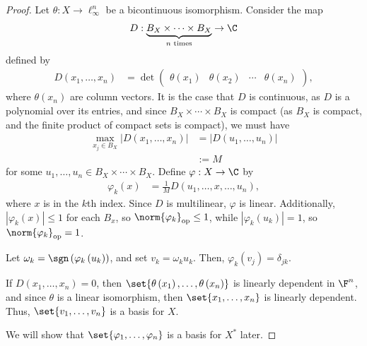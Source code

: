 \documentclass[10pt]{mypackage}
\begin{document}
\begin{proof}
  Let $\theta: X\rightarrow \ell_{\infty}^{n}$ be a bicontinuous isomorphism. Consider the map
  \begin{align*}
    D: \underbrace{B_{X}\times\cdots\times B_X}_{\text{$n$ times}}\rightarrow \C
  \end{align*}
  defined by
  \begin{align*}
    D\left(x_1,\dots,x_n\right) &= \det \begin{pmatrix}\theta\left(x_1\right) & \theta\left(x_2\right) & \cdots & \theta\left(x_n\right)\end{pmatrix},
  \end{align*}
  where $\theta\left(x_n\right)$ are column vectors. It is the case that $D$ is continuous, as $D$ is a polynomial over its entries, and since $B_X\times\cdots\times B_X$ is compact (as $B_X$ is compact, and the finite product of compact sets is compact), we must have
  \begin{align*}
    \max_{x_j\in B_X}\left\vert D\left(x_1,\dots,x_n\right) \right\vert &= \left\vert D\left(u_1,\dots,u_n\right) \right\vert\\
                                                                        &:= M
  \end{align*}
  for some $u_1,\dots,u_n\in B_X\times\cdots\times B_X$. Define $\varphi: X\rightarrow \C$ by
  \begin{align*}
    \varphi_k\left(x\right) &= \frac{1}{M}D\left(u_1,\dots,x,\dots,u_n\right),
  \end{align*}
  where $x$ is in the $k$th index. Since $D$ is multilinear, $\varphi$ is linear. Additionally, $\left\vert \varphi_k(x) \right\vert\leq 1$ for each $B_x$, so $\norm{\varphi_k}_{\text{op}} \leq 1$, while $\left\vert \varphi_k\left(u_k\right) \right\vert = 1$, so $\norm{\varphi_k}_{\text{op}} =1 $.\newline

  Let $\omega_k = \sgn\left(\varphi_k\left(u_k\right)\right)$, and set $v_k = \omega_ku_k$. Then, $\varphi_k\left(v_j\right) = \delta_{jk}$.\newline

  If $D\left(x_1,\dots,x_n\right) = 0$, then $\set{\theta\left(x_1\right),\dots,\theta\left(x_n\right)}$ is linearly dependent in $\F^n$, and since $\theta$ is a linear isomorphism, then $\set{x_1,\dots,x_n}$ is linearly dependent. Thus, $\set{v_1,\dots,v_n}$ is a basis for $X$.\newline

  We will show that $\set{\varphi_1,\dots,\varphi_n}$ is a basis for $X^{\ast}$ later.
\end{proof}
\end{document}
